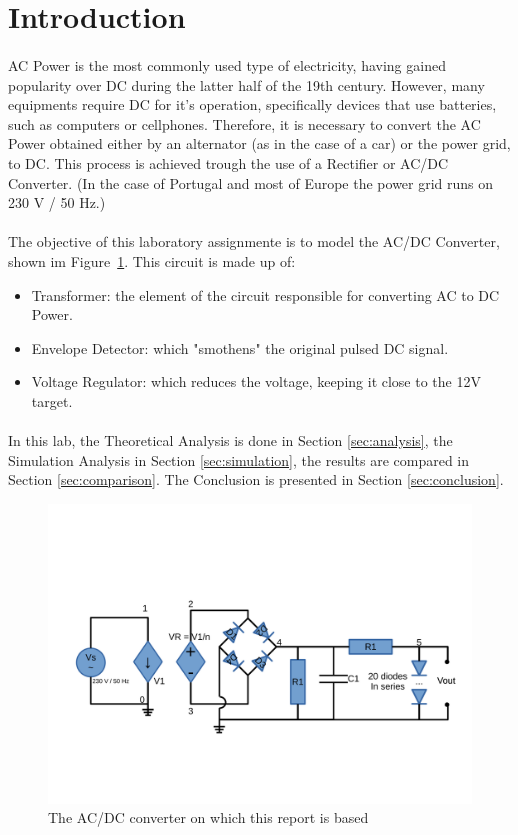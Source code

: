 \section{Introduction}
\label{sec:introduction}


\paragraph{} AC Power is the most commonly used type of electricity, having gained popularity over DC during the latter half of the 19th century. However, many equipments require DC for it's operation, 
specifically devices that use batteries, such as computers or cellphones. Therefore, it is necessary to convert the AC Power obtained either by an alternator (as in the case of a car) or the power grid, to DC.
This process is achieved trough the use of a Rectifier or AC/DC Converter. (In the case of Portugal and most of Europe the power grid runs on 230 V / 50 Hz.)

\paragraph{} The objective of this laboratory assignmente is to model the AC/DC Converter, shown im Figure~\ref{fig:cir}. This circuit is made up of:

\begin{itemize}
	\item Transformer: the element of the circuit responsible for converting AC to DC Power.
	\item Envelope Detector: which "smothens" the original pulsed DC signal.
	\item Voltage Regulator: which reduces the voltage, keeping it close to the 12V target.
\end{itemize}

\paragraph{} In this lab, the Theoretical Analysis is done in Section \ref{sec:analysis}, the Simulation Analysis in Section \ref{sec:simulation}, the results are compared in Section \ref{sec:comparison}. The
Conclusion is presented in Section \ref{sec:conclusion}.

\begin{figure}[h] \centering
\includegraphics[width=0.7\linewidth]{./cir.pdf}
\caption{The AC/DC converter on which this report is based}
\label{fig:cir}
\end{figure}

\clearpage
